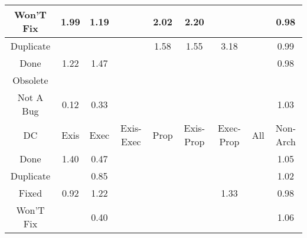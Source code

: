 \begin{tabular}{|c||c|c|c|c|c|c|c|c|}
\hline
Won'T Fix & \cellcolor[rgb]{0.9050473487600602,0.8376540073073969,0.42} 1.99 & \cellcolor[rgb]{0.9090686307749125,0.8395588251039059,0.42} 1.19 &  & \cellcolor[rgb]{0.9049147863957739,0.8375912146085246,0.42} 2.02 & \cellcolor[rgb]{0.9039998378900694,0.8371578179479275,0.42} 2.20 &  &  & \cellcolor[rgb]{0.906274404006241,0.8223655122962074,0.4165227770724916} 0.98 \\ 
\hline
Duplicate &  &  &  & \cellcolor[rgb]{0.9070782401176829,0.8386160084767972,0.42} 1.58 & \cellcolor[rgb]{0.9072726800755513,0.8387081116147348,0.42} 1.55 & \cellcolor[rgb]{0.8991069567964969,0.8348401374299195,0.42} 3.18 &  & \cellcolor[rgb]{0.9089064839695385,0.8348240241224818,0.41897938503823584} 0.99 \\ 
\hline
Done & \cellcolor[rgb]{0.9088790508276898,0.8394690240762741,0.42} 1.22 & \cellcolor[rgb]{0.9076283670856813,0.8388765949353226,0.42} 1.47 &  &  &  &  &  & \cellcolor[rgb]{0.9071753756451739,0.8266301113871564,0.4173636839354956} 0.98 \\ 
\hline
Obsolete &  &  &  &  &  &  &  &  \\ 
\hline
Not A Bug & \cellcolor[rgb]{0.7606519234813429,0.1330857711450232,0.2806084619159201} 0.12 & \cellcolor[rgb]{0.7973738159538164,0.3069027288480643,0.314882228223562} 0.33 &  &  &  &  &  & \cellcolor[rgb]{0.9098273037860384,0.8399181965302287,0.42} 1.03 \\ 
\hline
\hline
DC & Exis & Exec & Exis-Exec & Prop & Exis-Prop & Exec-Prop & All & Non-Arch \\ 
\hline
Done & \cellcolor[rgb]{0.9079988758653663,0.8390520990941208,0.42} 1.40 & \cellcolor[rgb]{0.8201381822795656,0.41465406278994377,0.3361289701275946} 0.47 &  &  &  &  &  & \cellcolor[rgb]{0.9097502852036821,0.8398817140438494,0.42} 1.05 \\ 
\hline
Duplicate &  & \cellcolor[rgb]{0.8842710495464736,0.7182163011866417,0.39598631291004205} 0.85 &  &  &  &  &  & \cellcolor[rgb]{0.9099206213403629,0.8399623995822773,0.42} 1.02 \\ 
\hline
Fixed & \cellcolor[rgb]{0.8968746085227265,0.777873147007572,0.4077496346212114} 0.92 & \cellcolor[rgb]{0.9088963413686597,0.839477214332523,0.42} 1.22 &  &  &  & \cellcolor[rgb]{0.9083550099242638,0.8392207941746512,0.42} 1.33 &  & \cellcolor[rgb]{0.9063926079107344,0.822925010777476,0.4166331007166854} 0.98 \\ 
\hline
Won'T Fix &  & \cellcolor[rgb]{0.8083025162712822,0.3586319103507358,0.3250823485198634} 0.40 &  &  &  &  &  & \cellcolor[rgb]{0.9097084603883417,0.8398619022892145,0.42} 1.06 \\ 

\end{tabular}
